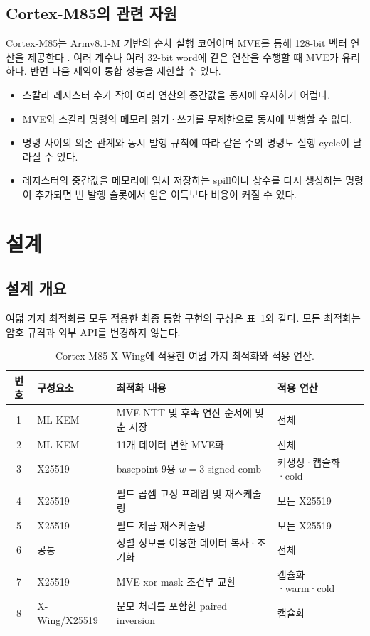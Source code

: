 \documentclass[runningheads,orivec]{llncs}
\newcommand{\xwing}{X-Wing}
\begin{document}
\subsection{Cortex-M85의 관련 자원}

Cortex-M85는 Armv8.1-M 기반의 순차 실행 코어이며 MVE를 통해 128-bit 벡터 연산을
제공한다 \cite{ArmM85Opt}. 여러 계수나 여러 32-bit word에 같은 연산을 수행할 때
MVE가 유리하다. 반면 다음 제약이 통합 성능을 제한할 수 있다.
\begin{itemize}[leftmargin=*,itemsep=1pt]
\item 스칼라 레지스터 수가 작아 여러 연산의 중간값을 동시에 유지하기 어렵다.
\item MVE와 스칼라 명령의 메모리 읽기·쓰기를 무제한으로 동시에 발행할 수 없다.
\item 명령 사이의 의존 관계와 동시 발행 규칙에 따라 같은 수의 명령도 실행 cycle이
      달라질 수 있다.
\item 레지스터의 중간값을 메모리에 임시 저장하는 spill이나 상수를 다시 생성하는
      명령이 추가되면 빈 발행 슬롯에서 얻은 이득보다 비용이 커질 수 있다.
\end{itemize}

\section{설계}\label{sec:design}

\subsection{설계 개요}

여덟 가지 최적화를 모두 적용한 최종 통합 구현의 구성은 표~\ref{tab:transform-scope}와
같다. 모든 최적화는 암호 규격과 외부 API를 변경하지 않는다.

\begin{table}[t]
\centering
\caption{Cortex-M85 \xwing{}에 적용한 여덟 가지 최적화와 적용 연산.}
\label{tab:transform-scope}
\footnotesize
\renewcommand{\arraystretch}{1.12}
\begin{tabularx}{\textwidth}{@{}cl>{\raggedright\arraybackslash}Xl@{}}
\toprule
번호 & 구성요소 & 최적화 내용 & 적용 연산 \\
\midrule
1 & ML-KEM & MVE NTT 및 후속 연산 순서에 맞춘 저장 & 전체 \\
2 & ML-KEM & 11개 데이터 변환 MVE화 & 전체 \\
3 & X25519 & basepoint 9용 $w=3$ signed comb & 키생성·캡슐화·cold \\
4 & X25519 & 필드 곱셈 고정 프레임 및 재스케줄링 & 모든 X25519 \\
5 & X25519 & 필드 제곱 재스케줄링 & 모든 X25519 \\
6 & 공통 & 정렬 정보를 이용한 데이터 복사·초기화 & 전체 \\
7 & X25519 & MVE xor-mask 조건부 교환 & 캡슐화·warm·cold \\
8 & \xwing{}/X25519 & 0 분모 처리를 포함한 paired inversion & 캡슐화 \\
\bottomrule
\end{tabularx}
\end{table}
\end{document}
